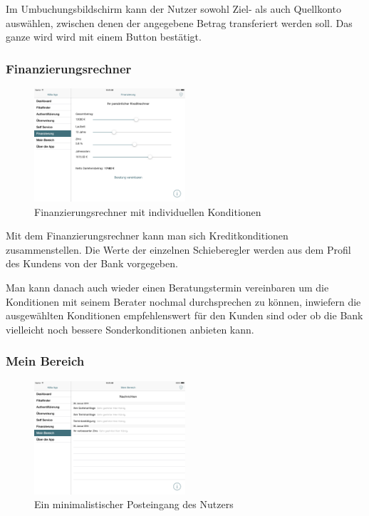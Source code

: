 	Im Umbuchungsbildschirm kann der Nutzer sowohl Ziel- als auch Quellkonto auswählen, zwischen denen der angegebene Betrag transferiert werden soll. Das ganze wird wird mit einem Button bestätigt.

\subsubsection{Finanzierungsrechner}
\begin{figure}[h]
	\centering
  \includegraphics[width=0.5\textwidth]{Pictures/finanzierung}
	\caption{Finanzierungsrechner mit individuellen Konditionen}
	\label{fig9}
\end{figure}

	Mit dem Finanzierungsrechner kann man sich Kreditkonditionen zusammenstellen. Die Werte der einzelnen Schieberegler werden aus dem Profil des Kundens von der Bank vorgegeben.

	Man kann danach auch wieder einen Beratungstermin vereinbaren um die Konditionen mit seinem Berater nochmal durchsprechen zu können, inwiefern die ausgewählten Konditionen empfehlenswert für den Kunden sind oder ob die Bank vielleicht noch bessere Sonderkonditionen anbieten kann.

\subsubsection{Mein Bereich}

\begin{figure}
	\centering
  \includegraphics[width=0.5\textwidth]{Pictures/mbereichneu}
	\caption{Ein minimalistischer Posteingang des Nutzers\label{fig10}}
\end{figure}

